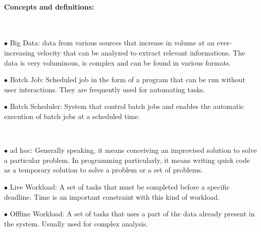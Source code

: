 \documentclass[11pt]{article}
\begin{document}
\paragraph{Concepts and definitions:} 
~\newline ~\newline
\begin{minipage}[t]{1\textwidth}
    \begin{description}
    \item $\bullet$ Big Data: data from various sources that increase in volume at an ever-increasing velocity that can be analyzed to extract relevant informations. The data is very voluminous, is complex and can be found in various formats.
    \item $\bullet$ Batch Job: Scheduled job in the form of a program that can be run without user interactions. They are frequently used for automating tasks.
    \item $\bullet$ Batch Scheduler: System that control batch jobs and enables the automatic execution of batch jobs at a scheduled time. 

    \end{description}
\end{minipage}
\\
\begin{minipage}[t]{1\textwidth}
    \begin{description}
        \item $\bullet$ ad hoc: Generally speaking, it means conceiving an improvised solution to solve a particular problem. In programming particularly, it means writing quick code as a temporary solution to solve a problem or a set of problems.
        \item $\bullet$ Live Workload: A set of tasks that must be completed before a specific deadline. Time is an important constraint with this kind of workload. 
        \item $\bullet$ Offline Workload: A set of tasks that uses a part of the data already present in the system. Usually used for complex analysis.
    \end{description}
\end{minipage}

~\newline
\end{document}

